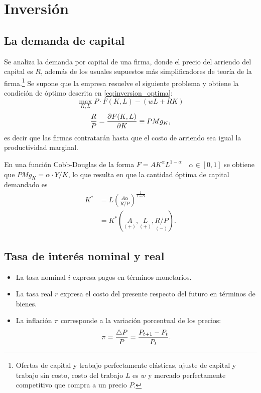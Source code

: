\documentclass[DeGregorioResumen]{subfiles}
\begin{document}
\section{Inversión}
\label{cap_inversion}
\subsection{La demanda de capital}

Se analiza la demanda por capital de una firma, donde el precio del arriendo del capital es $R$, además de los usuales supuestos más simplificadores de teoría de la firma.\footnote{Ofertas de capital y trabajo perfectamente elásticas, ajuste de capital y trabajo sin costo, costo del trabajo $L$ es $w$ y mercado perfectamente competitivo que compra a un precio $P$.} Se supone que la empresa resuelve el siguiente problema y obtiene la condición de óptimo descrita en \eqref{eq:inversion_optima}:
\begin{equation*}
\max_{K,L}P\cdot F(K,L)-(wL+RK)
\end{equation*}
\begin{equation}
\frac{R}{P}=\frac{\partial F(K,L)}{\partial K} \equiv PMg_K,
\label{eq:inversion_optima}
\end{equation}
es decir que las firmas contratarán hasta que el costo de arriendo sea igual la productividad marginal.



En una función Cobb-Douglas de la forma $F=AK^\alpha L^{1-\alpha}\quad \alpha \in[0,1] $ se obtiene que $PMg_K=\alpha\cdot Y/K $, lo que resulta en que la cantidad óptima de capital demandado es
\begin{align}
K^* &= L\left(\frac{A\alpha}{R/P}\right)^{\frac{1}{1-\alpha}} \\
&= K^*(\underset{(+)}{A}, 	\underset{(+)}{L}, \underset{(-)}{R/P}).
\end{align}

\subsection{Tasa de interés nominal y real}

\begin{itemize}
\item La tasa nominal $i$ expresa pagos en términos monetarios.
\item La tasa real $r$ expresa el costo del presente respecto del futuro en términos de bienes.
\item La inflación $\pi$ corresponde a la variación porcentual de los precios:
\begin{equation}
\pi=\frac{\bigtriangleup P}{P}=\frac{{P}_{t+1}-P_t}{P_t}.
\end{equation}
\end{itemize}
\end{document}
